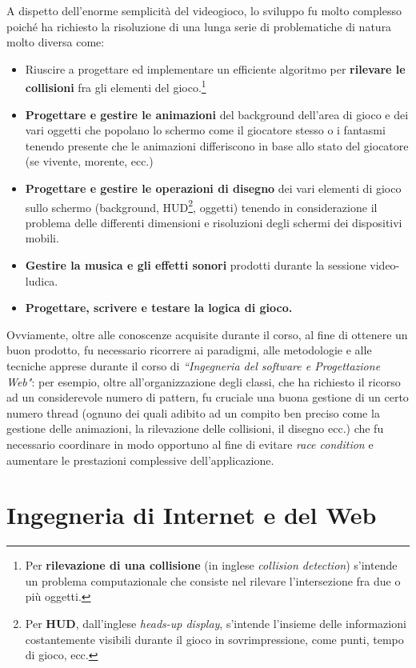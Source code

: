 \documentclass[10pt,a4paper, titlepage]{article}
\begin{document}
A dispetto dell'enorme semplicità del videogioco, lo sviluppo fu molto complesso poiché ha richiesto la risoluzione di una lunga serie di problematiche di natura molto diversa come:
\begin{itemize}
\item Riuscire a progettare ed implementare un efficiente algoritmo per \textbf{rilevare le collisioni} fra gli elementi del gioco.\footnote{Per \textbf{rilevazione di una collisione} (in inglese \textit{collision detection}) s'intende un problema computazionale che consiste nel rilevare l'intersezione fra due o più oggetti.}
\item \textbf{Progettare e gestire le animazioni} del background dell'area di gioco e dei vari oggetti che popolano lo schermo come il giocatore stesso o i fantasmi tenendo presente che le animazioni differiscono in base allo stato del giocatore (se vivente, morente, ecc.)
\item \textbf{Progettare e gestire le operazioni di disegno} dei vari elementi di gioco sullo schermo (background, HUD\footnote{Per \textbf{HUD}, dall'inglese \textit{heads-up display}, s'intende l'insieme delle informazioni costantemente visibili durante il gioco in sovrimpressione, come punti, tempo di gioco, ecc.}, oggetti) tenendo in considerazione il problema delle differenti dimensioni e risoluzioni degli schermi dei dispositivi mobili. 
\item \textbf{Gestire la musica e gli effetti sonori} prodotti durante la sessione video-ludica.
\item \textbf{Progettare, scrivere e testare la logica di gioco.}
\end{itemize}

Ovviamente, oltre alle conoscenze acquisite durante il corso, al fine di ottenere un buon prodotto, fu necessario ricorrere ai paradigmi, alle metodologie e alle tecniche apprese durante il corso di \textit{``Ingegneria del software e Progettazione Web"}: per esempio, oltre all'organizzazione degli classi, che ha richiesto il ricorso ad un considerevole numero di pattern, fu cruciale una buona  gestione di un certo numero thread (ognuno dei quali adibito ad un compito ben preciso come la gestione delle animazioni, la rilevazione delle collisioni, il disegno ecc.) che fu necessario coordinare in modo opportuno al fine di evitare \textit{race condition} e aumentare le prestazioni complessive dell'applicazione.

\newpage
\section{Ingegneria di Internet e del Web}
\end{document}
